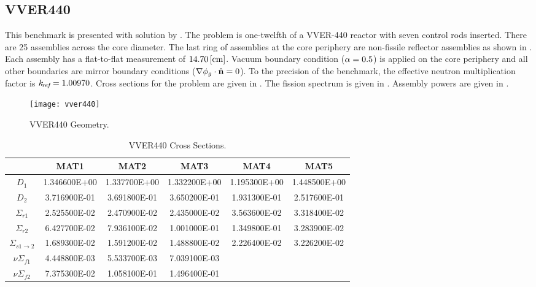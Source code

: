   \subsection{VVER440}
    \label{sec:vver440}
    This benchmark is presented with solution by \textcite{chao}.
    The problem is one-twelfth of a VVER-440 reactor with seven control rods
    inserted. There are 25 assemblies across the core diameter. The last ring of
    assemblies at the core periphery are non-fissile reflector assemblies as
    shown in . Each assembly has a flat-to-flat
    measurement of ${14.70 \left[\text{{cm}}\right]}$. Vacuum boundary condition ($\alpha =
    0.5$) is applied on the core periphery and all other boundaries are mirror
    boundary conditions ($\mathbf{\nabla} \phi_g \cdot \hat{\mathbf{n}} = 0$). To the precision of
    the benchmark, the effective neutron multiplication factor is $k_{\!\mbox{\scriptsize \em ref}} =
    1.00970$.  Cross sections for the problem are given in .
    The fission spectrum is given in . Assembly powers are
    given in .

    \begin{figure}
      \centering
      \texttt{[image: vver440]}
      \caption{VVER440 Geometry.}
      \label{fig:vver440_geom}
    \end{figure}

    \begin{table}
      \caption{VVER440 Cross Sections.}
      \label{tab:vver440xs}
      \begin{center}
        \begin{tabular}{cccccc}
          \toprule
          &MAT1&MAT2&MAT3&MAT4&MAT5\\
          \midrule
          $D_1$&1.346600E+00&1.337700E+00&1.332200E+00&1.195300E+00&1.448500E+00\\
          $D_2$&3.716900E-01&3.691800E-01&3.650200E-01&1.931300E-01&2.517600E-01\\
          $\Sigma_{r1}$&2.525500E-02&2.470900E-02&2.435000E-02&3.563600E-02&3.318400E-02\\
          $\Sigma_{r2}$&6.427700E-02&7.936100E-02&1.001000E-01&1.349800E-01&3.283900E-02\\
          $\Sigma_{s 1\rightarrow 2}$&1.689300E-02&1.591200E-02&1.488800E-02&2.226400E-02&3.226200E-02\\
          $ \nu \Sigma_{f1}$&4.448800E-03&5.533700E-03&7.039100E-03&&\\
          $ \nu \Sigma_{f2}$&7.375300E-02&1.058100E-01&1.496400E-01&&\\
          \bottomrule
        \end{tabular}
      \end{center}
    \end{table}

